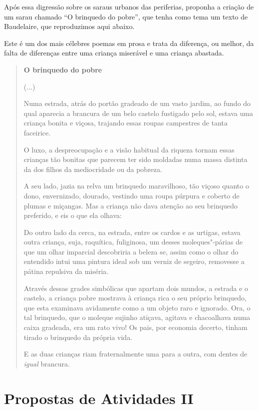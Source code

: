 \documentclass[12pt]{extarticle}
\begin{document}
Após essa digressão sobre os saraus urbanos das periferias, proponha
a criação de um sarau chamado ``O brinquedo do pobre'', que tenha como tema um texto de Baudelaire,
que reproduzimos aqui abaixo.

Este é um 
dos mais célebres poemas em prosa e trata da diferença, ou melhor, da 
falta de diferenças entre
uma criança miserável e uma criança abastada.

\begin{quote}
\textbf{O brinquedo do pobre}\medskip

(...)

Numa estrada, atrás do portão gradeado de um vasto jardim, ao fundo do qual aparecia
a brancura de um belo castelo fustigado pelo sol, estava uma
criança bonita e viçosa, trajando essas roupas campestres de tanta
faceirice.

O luxo, a despreocupação e a visão habitual da riqueza tornam essas
crianças tão bonitas que parecem ter sido moldadas numa massa distinta da
dos filhos da mediocridade ou da pobreza.

A seu lado, jazia na relva um brinquedo maravilhoso, tão viçoso
quanto o dono, envernizado, dourado, vestindo uma roupa púrpura
e coberto de plumas e miçangas. Mas a criança não dava atenção ao seu
brinquedo preferido, e eis o que ela olhava:

Do outro lado da cerca, na estrada, entre os cardos e as urtigas, estava
outra criança, suja, raquítica, fuliginosa, um desses moleques"-párias
de que um olhar imparcial descobriria a beleza se, assim como o olhar do
entendido intui uma pintura ideal sob um verniz de segeiro,
removesse a pátina repulsiva da miséria.

Através dessas grades simbólicas que apartam dois mundos, a estrada e o
castelo, a criança pobre mostrava à criança rica o seu próprio
brinquedo, que esta examinava avidamente como a um objeto raro e
ignorado. Ora, o tal brinquedo, que o moleque sujinho atiçava,
agitava e chacoalhava numa caixa gradeada, era um rato vivo! Os pais,
por economia decerto, tinham tirado o brinquedo da própria vida.

E as duas crianças riam fraternalmente uma para a outra, com dentes de
\textit{igual} brancura.
\end{quote}

\section{Propostas de Atividades II}
\end{document}
